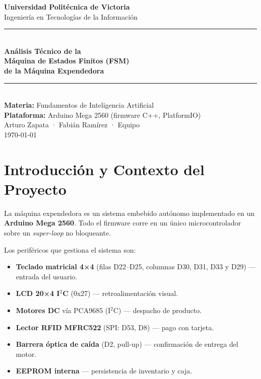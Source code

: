 \documentclass[12pt,a4paper]{article}
\begin{document}

\begin{titlepage}
    \centering
    \vspace*{2cm}
    {\LARGE\bfseries Universidad Politécnica de Victoria}\\[0.5cm]
    {\large Ingeniería en Tecnologías de la Información}\\[1.5cm]
    \rule{\linewidth}{1.5pt}\\[0.6cm]
    {\huge\bfseries Análisis Técnico de la\\[0.3cm]
     Máquina de Estados Finitos (FSM)\\[0.3cm]
     de la Máquina Expendedora}\\[0.4cm]
    \rule{\linewidth}{1.5pt}\\[1.2cm]
    {\large\bfseries Materia:} Fundamentos de Inteligencia Artificial\\[0.3cm]
    {\large\bfseries Plataforma:} Arduino Mega 2560 (firmware C++, PlatformIO)\\[1.5cm]
    {\large Arturo Zapata \quad · \quad Fabián Ramírez \quad · \quad Equipo}\\[0.5cm]
    {\large\today}
    \vfill
\end{titlepage}

\tableofcontents
\newpage

\section{Introducción y Contexto del Proyecto}

La máquina expendedora es un sistema embebido autónomo implementado en un
\textbf{Arduino Mega 2560}. Todo el firmware corre en un único microcontrolador
sobre un \emph{super-loop} no bloqueante.

Los periféricos que gestiona el sistema son:
\begin{itemize}
    \item \textbf{Teclado matricial 4×4} (filas D22–D25, columnas D30, D31, D33 y D29) — entrada del usuario.
    \item \textbf{LCD 20×4 I$^2$C} (0x27) — retroalimentación visual.
    \item \textbf{Motores DC} vía PCA9685 (I$^2$C) — despacho de producto.
    \item \textbf{Lector RFID MFRC522} (SPI: D53, D8) — pago con tarjeta.
    \item \textbf{Barrera óptica de caída} (D2, pull-up) — confirmación de entrega del motor.
    \item \textbf{EEPROM interna} — persistencia de inventario y caja.
\end{itemize}
\end{document}
